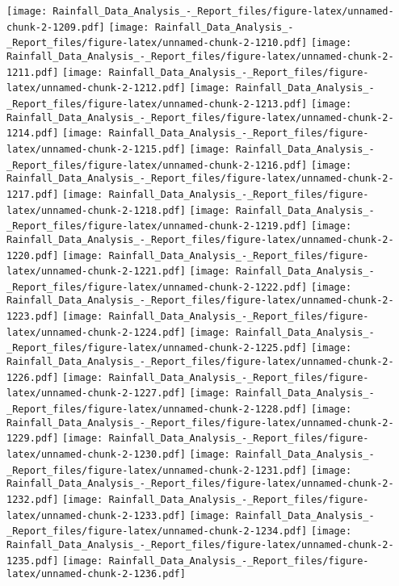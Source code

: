 \documentclass[
]{article}
\begin{document}
\texttt{[image: Rainfall\_Data\_Analysis\_-\_Report\_files/figure-latex/unnamed-chunk-2-1209.pdf]}
\texttt{[image: Rainfall\_Data\_Analysis\_-\_Report\_files/figure-latex/unnamed-chunk-2-1210.pdf]}
\texttt{[image: Rainfall\_Data\_Analysis\_-\_Report\_files/figure-latex/unnamed-chunk-2-1211.pdf]}
\texttt{[image: Rainfall\_Data\_Analysis\_-\_Report\_files/figure-latex/unnamed-chunk-2-1212.pdf]}
\texttt{[image: Rainfall\_Data\_Analysis\_-\_Report\_files/figure-latex/unnamed-chunk-2-1213.pdf]}
\texttt{[image: Rainfall\_Data\_Analysis\_-\_Report\_files/figure-latex/unnamed-chunk-2-1214.pdf]}
\texttt{[image: Rainfall\_Data\_Analysis\_-\_Report\_files/figure-latex/unnamed-chunk-2-1215.pdf]}
\texttt{[image: Rainfall\_Data\_Analysis\_-\_Report\_files/figure-latex/unnamed-chunk-2-1216.pdf]}
\texttt{[image: Rainfall\_Data\_Analysis\_-\_Report\_files/figure-latex/unnamed-chunk-2-1217.pdf]}
\texttt{[image: Rainfall\_Data\_Analysis\_-\_Report\_files/figure-latex/unnamed-chunk-2-1218.pdf]}
\texttt{[image: Rainfall\_Data\_Analysis\_-\_Report\_files/figure-latex/unnamed-chunk-2-1219.pdf]}
\texttt{[image: Rainfall\_Data\_Analysis\_-\_Report\_files/figure-latex/unnamed-chunk-2-1220.pdf]}
\texttt{[image: Rainfall\_Data\_Analysis\_-\_Report\_files/figure-latex/unnamed-chunk-2-1221.pdf]}
\texttt{[image: Rainfall\_Data\_Analysis\_-\_Report\_files/figure-latex/unnamed-chunk-2-1222.pdf]}
\texttt{[image: Rainfall\_Data\_Analysis\_-\_Report\_files/figure-latex/unnamed-chunk-2-1223.pdf]}
\texttt{[image: Rainfall\_Data\_Analysis\_-\_Report\_files/figure-latex/unnamed-chunk-2-1224.pdf]}
\texttt{[image: Rainfall\_Data\_Analysis\_-\_Report\_files/figure-latex/unnamed-chunk-2-1225.pdf]}
\texttt{[image: Rainfall\_Data\_Analysis\_-\_Report\_files/figure-latex/unnamed-chunk-2-1226.pdf]}
\texttt{[image: Rainfall\_Data\_Analysis\_-\_Report\_files/figure-latex/unnamed-chunk-2-1227.pdf]}
\texttt{[image: Rainfall\_Data\_Analysis\_-\_Report\_files/figure-latex/unnamed-chunk-2-1228.pdf]}
\texttt{[image: Rainfall\_Data\_Analysis\_-\_Report\_files/figure-latex/unnamed-chunk-2-1229.pdf]}
\texttt{[image: Rainfall\_Data\_Analysis\_-\_Report\_files/figure-latex/unnamed-chunk-2-1230.pdf]}
\texttt{[image: Rainfall\_Data\_Analysis\_-\_Report\_files/figure-latex/unnamed-chunk-2-1231.pdf]}
\texttt{[image: Rainfall\_Data\_Analysis\_-\_Report\_files/figure-latex/unnamed-chunk-2-1232.pdf]}
\texttt{[image: Rainfall\_Data\_Analysis\_-\_Report\_files/figure-latex/unnamed-chunk-2-1233.pdf]}
\texttt{[image: Rainfall\_Data\_Analysis\_-\_Report\_files/figure-latex/unnamed-chunk-2-1234.pdf]}
\texttt{[image: Rainfall\_Data\_Analysis\_-\_Report\_files/figure-latex/unnamed-chunk-2-1235.pdf]}
\texttt{[image: Rainfall\_Data\_Analysis\_-\_Report\_files/figure-latex/unnamed-chunk-2-1236.pdf]}
\end{document}
